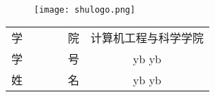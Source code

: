 
~

\vspace{10mm}


\begin{figure}[!htbp]
    \centering
    \texttt{[image: shulogo.png]}
\end{figure}


\centerline{}

\vspace{8mm}

\centerline{}

\vspace{8mm}


\vspace{6cm}

\begin{table}[!htbp]\large
    \centering
    \begin{tabular}{r c}
        学~~~~~~~~院    & 计算机工程与科学学院\\  \cmidrule(l){2-2} 
        学~~~~~~~~号    & yb yb\\               \cmidrule(l){2-2} 
        姓~~~~~~~~名    & yb yb\\            \cmidrule(l){2-2} 
    \end{tabular}
\end{table}